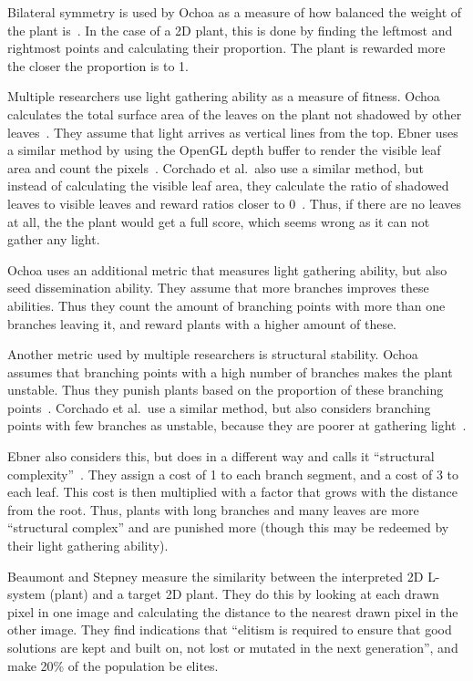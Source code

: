 Bilateral symmetry is used by Ochoa as a measure of how balanced the weight of the plant is~\cite{1998Ochoa}.
In the case of a 2D plant, this is done by finding the leftmost and rightmost points and calculating their proportion.
The plant is rewarded more the closer the proportion is to 1.

Multiple researchers use light gathering ability as a measure of fitness.
Ochoa calculates the total surface area of the leaves on the plant not shadowed by other leaves~\cite{1998Ochoa}.
They assume that light arrives as vertical lines from the top.
Ebner uses a similar method by using the OpenGL depth buffer to render the visible leaf area and count the pixels~\cite{2003Ebner}.
Corchado et al.\ also use a similar method, but instead of calculating the visible leaf area, they calculate the ratio of shadowed leaves to visible leaves and reward ratios closer to 0~\cite{2009Corchado}.
Thus, if there are no leaves at all, the the plant would get a full score, which seems wrong as it can not gather any light.

Ochoa uses an additional metric that measures light gathering ability, but also seed dissemination ability.
They assume that more branches improves these abilities.
Thus they count the amount of branching points with more than one branches leaving it, and reward plants with a higher amount of these.~\cite{1998Ochoa}

Another metric used by multiple researchers is structural stability.
Ochoa assumes that branching points with a high number of branches makes the plant unstable.
Thus they punish plants based on the proportion of these branching points~\cite{1998Ochoa}.
Corchado et al.\ use a similar method, but also considers branching points with few branches as unstable, because they are poorer at gathering light~\cite{2009Corchado}.

Ebner also considers this, but does in a different way and calls it ``structural complexity''~\cite{2003Ebner}.
They assign a cost of 1 to each branch segment, and a cost of 3 to each leaf.
This cost is then multiplied with a factor that grows with the distance from the root.
Thus, plants with long branches and many leaves are more ``structural complex'' and are punished more (though this may be redeemed by their light gathering ability).

Beaumont and Stepney measure the similarity between the interpreted 2D \gls{L-system} (plant) and a target 2D plant.
They do this by looking at each drawn pixel in one image and calculating the distance to the nearest drawn pixel in the other image.
They find indications that ``elitism is required to ensure that good solutions are kept and built on, not lost or mutated in the next generation'', and make 20\% of the population be elites.~\cite{2009Beaumont}


